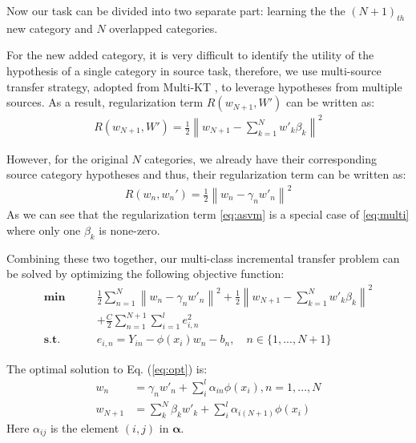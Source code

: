 Now our task can be divided into two separate part: learning the the $(N+1)_{th}$ new category and $N$ overlapped categories.

For the new added category, it is very difficult to identify the utility of the hypothesis of a single category in source task, therefore, we use multi-source transfer strategy, adopted from Multi-KT \cite{tommasi2014learning}, to leverage hypotheses from multiple sources. As a result, regularization term $R(w_{N+1},W')$ can be written as:
\begin{equation}
\begin{aligned}
R(w_{N+1},W')= \frac{1}{2}{\left\| {{w_{N + 1}} - \sum\limits_{k = 1}^N {w{'_k}{\beta _k}} } \right\|^2} 
\end{aligned}\label{eq:multi}
\end{equation}


However, for the original $N$ categories, we already have their corresponding source category hypotheses and thus, their regularization term can be written as:
\begin{equation}\label{eq:asvm}
\begin{aligned}
R(w_n,w_n')= \frac{1}{2}{{{\left\| {{w_n} - {\gamma _n}{{w'}_n}} \right\|}^2}}  
\end{aligned}
\end{equation}
As we can see that the regularization term \eqref{eq:asvm} is a special case of \eqref{eq:multi} where only one $\beta_k$ is none-zero. 

Combining these two together, our multi-class incremental transfer problem can be solved by optimizing the following objective function:
\begin{equation}
\begin{aligned}
\textbf{min}\qquad {} & \frac{1}{2}\sum\limits_{n = 1}^N {{{\left\| {{w_n} - {\gamma _n}{{w'}_n}} \right\|}^2}}  + \frac{1}{2}{\left\| {{w_{N + 1}} - \sum\limits_{k = 1}^N {w{'_k}{\beta _k}} } \right\|^2}\\& +\frac{C}{2}\sum\limits_{n = 1}^{N + 1} {\sum\limits_{i = 1}^l {e_{i,n}^2} }  \\
\textbf{s.t.}\qquad {} &{e_{i,n}} = {Y_{in}} - \phi ({x_i}){w_n} - {b_n}, \quad n \in \{1,...,N+1\}
\end{aligned}\label{eq:opt}
\end{equation}

The optimal solution to  Eq. (\ref{eq:opt}) is:
\begin{equation}\label{eq:solu}
\begin{aligned}
{w_n}&= {\gamma _n}{{w'}_n} + \sum\limits_i^l {{\alpha _{in}}{\phi(x_i)}} ,{n = 1,...,N}\\
{w_{N + 1}}&= \sum\limits_k^N {{\beta _k}{{w'}_k}}  + \sum\limits_i^l {{\alpha _{i(N + 1)}}{\phi(x_i)}} 
\end{aligned}
\end{equation}
Here $\alpha_{ij}$ is the element $(i,j)$ in $\boldsymbol{\alpha}$. 

